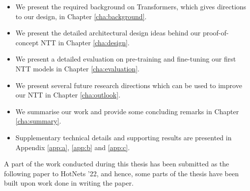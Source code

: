 \begin{itemize}
\item We present the required background on Transformers, which gives directions to our design, in Chapter \ref{cha:background}.
\item We present the detailed architectural design ideas behind our proof-of-concept NTT in Chapter \ref{cha:design}.
\item We present a detailed evaluation on pre-training and fine-tuning our first NTT models in Chapter \ref{cha:evaluation}.
\item We present several future research directions which can be used to improve our NTT in Chapter \ref{cha:outlook}.
\item We summarise our work and provide some concluding remarks in Chapter \ref{cha:summary}.
\item Supplementary technical details and supporting results are presented in Appendix \ref{app:a}, \ref{app:b} and \ref{app:c}. 
\end{itemize}

A part of the work conducted during this thesis has been submitted as the following paper\cite{newhope} to HotNets '22, and hence, some parts of the thesis have been built upon work done in writing the paper.
